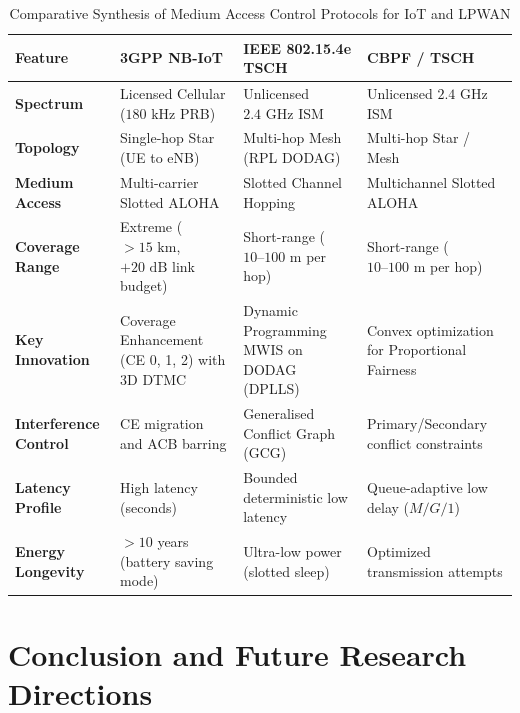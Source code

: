 \begin{table}[htbp]
\centering
\caption{Comparative Synthesis of Medium Access Control Protocols for IoT and LPWAN}
\label{tab:iot_protocols_comparison}
\begin{tabular}{p{2.8cm}p{3.8cm}p{3.8cm}p{3.6cm}}
\toprule
\textbf{Feature} & \textbf{3GPP NB-IoT} \cite{ramineni2022performance} & \textbf{IEEE 802.15.4e TSCH} \cite{bommisetty2022dplls} & \textbf{CBPF / TSCH} \cite{bommisetty2023cbpf} \\
\midrule
\textbf{Spectrum} & Licensed Cellular ($180\text{~kHz}$ PRB) & Unlicensed $2.4\text{~GHz}$ ISM & Unlicensed $2.4\text{~GHz}$ ISM \\
\textbf{Topology} & Single-hop Star (UE to eNB) & Multi-hop Mesh (RPL DODAG) & Multi-hop Star / Mesh \\
\textbf{Medium Access} & Multi-carrier Slotted ALOHA & Slotted Channel Hopping & Multichannel Slotted ALOHA \\
\textbf{Coverage Range} & Extreme ($> 15\text{~km}$, $+20\text{~dB}$ link budget) & Short-range ($10\text{--}100\text{~m}$ per hop) & Short-range ($10\text{--}100\text{~m}$ per hop) \\
\textbf{Key Innovation} & Coverage Enhancement (CE 0, 1, 2) with 3D DTMC & Dynamic Programming MWIS on DODAG (DPLLS) & Convex optimization for Proportional Fairness \\
\textbf{Interference Control} & CE migration and ACB barring & Generalised Conflict Graph (GCG) & Primary/Secondary conflict constraints \\
\textbf{Latency Profile} & High latency (seconds) & Bounded deterministic low latency & Queue-adaptive low delay ($M/G/1$) \\
\textbf{Energy Longevity} & $> 10$ years (battery saving mode) & Ultra-low power (slotted sleep) & Optimized transmission attempts \\
\bottomrule
\end{tabular}
\end{table}

\section{Conclusion and Future Research Directions}
\label{sec:iot_conclusion}

